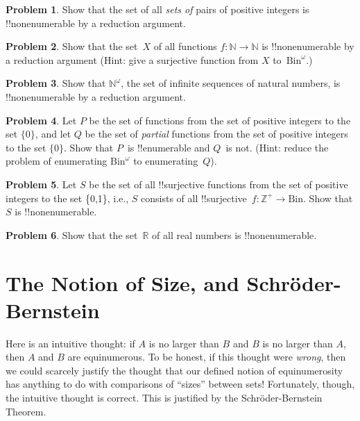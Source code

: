 \documentclass[10pt,a4paper]{article}
\theoremstyle{plain}
\theoremstyle{definition}
\newtheorem{prob}{Problem}[section]
\theoremstyle{remark}
\newenvironment{explain}{}{}
\newcommand*{\olfileid}[3]{}
\newcommand*{\olsection}[1]{\section*{#1}}
\providecommand{\Nat}{\ensuremath{\mathbb{N}}}
\providecommand{\Real}{\mathbb{R}}
\providecommand{\PosInt}{\mathbb{Z}^{+}}
\providecommand{\Bin}{\mathrm{Bin}}
\begin{document}
\begin{prob}
Show that the set of all \emph{sets of} pairs of positive integers is
!!{nonenumerable} by a reduction argument.
\end{prob}

\begin{prob}\label{sfr:siz:red:prob:nat-nat}
  Show that the set~$X$ of all functions $f\colon \Nat \to \Nat$ is
  !!{nonenumerable} by a reduction argument (Hint: give a surjective
  function from $X$ to~$\Bin^\omega$.)
\end{prob}

\begin{prob}
Show that $\Nat^\omega$, the set of infinite sequences of
natural numbers, is !!{nonenumerable} by a reduction argument.
\end{prob}

\begin{prob}
Let $P$ be the set of functions from the set of positive
integers to the set $\{0\}$, and let $Q$ be the set of \emph{partial}
functions from the set of positive integers to the set $\{0\}$. Show
that $P$~is !!{enumerable} and $Q$~is not. (Hint: reduce the problem
of enumerating $\Bin^\omega$ to enumerating~$Q$).
\end{prob}

\begin{prob}
Let $S$ be the set of all !!{surjective} functions from the set of
positive integers to the set \{0,1\}, i.e., $S$ consists of all
!!{surjective}~$f\colon \PosInt \to \Bin$.  Show that $S$ is
!!{nonenumerable}.
\end{prob}

\begin{prob}
Show that the set~$\Real$ of all real numbers is !!{nonenumerable}.
\end{prob}





\olfileid{sfr}{siz}{sb}

\olsection{The Notion of Size, and Schr\"oder-Bernstein}

\begin{explain}
Here is an intuitive thought: if $A$ is no larger than $B$ and $B$ is
no larger than $A$, then $A$ and $B$ are equinumerous. To be honest,
if this thought were \emph{wrong}, then we could scarcely justify the
thought that our defined notion of equinumerosity has anything to do
with comparisons of ``sizes'' between sets!{} Fortunately, though,
the intuitive thought is correct. This is justified by the
Schr\"oder-Bernstein Theorem.
\end{explain}
\end{document}
